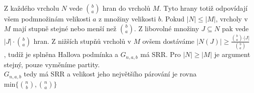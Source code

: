 \documentclass{scrartcl}
\begin{document}
        Z každého vrcholu $N$ vede $\binom{b}{a}$ hran do vrcholů $M$. Tyto hrany totiž odpovídají všem podmnožinám velikosti $a$ z množiny velikosti $b$. Pokud $\vert N \vert \leq \vert M \vert$, vrcholy v $M$ mají stupně stejné nebo menší než $\binom{b}{a}$. Z libovolné množiny $J \subseteq N$ pak vede $\vert J \vert \cdot \binom{b}{a}$ hran. Z nižších stupňů vrcholů v $M$ ovšem dostáváme $\vert N(J) \vert \geq \frac{\binom{b}{a} \cdot \vert J \vert}{\binom{b}{a}}$, tudíž je splněna Hallova podmínka a $G_{n,a,b}$ má SRR. Pro $\vert N \vert \geq \vert M \vert$ je argument stejný, pouze vyměníme partity.\\

        $G_{n,a,b}$ tedy má SRR a velikost jeho největšího párování je rovna $\text{min}\{\binom{n}{b},\binom{n}{a}\}$
                
    
\end{document}
